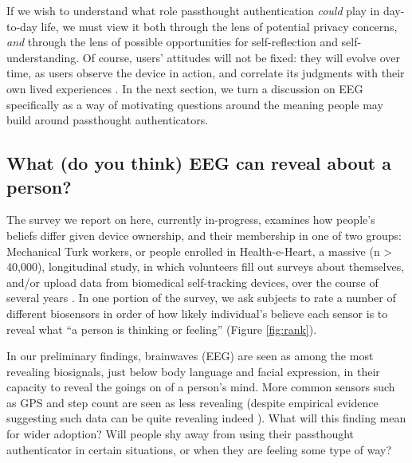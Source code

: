 \documentclass[sigconf]{acmart}
\begin{document}
If we wish to understand what role passthought authentication \emph{could} play in day-to-day life,
we must view it both through the lens of potential privacy concerns, \emph{and} through the lens of possible opportunities for self-reflection and self-understanding. 
Of course, users' attitudes will not be fixed: they will evolve over time, as users observe the device in action, and correlate its judgments with their own lived experiences \cite{Nafus2016}.
In the next section, we turn a discussion on EEG specifically as a way of motivating questions around the meaning people may build around passthought authenticators.


\subsection{What (do you think) EEG can reveal about a person?}
\label{sec:org8e44d66}

The survey we report on here, currently in-progress, examines how people's beliefs differ given device ownership, and their membership in one of two groups: Mechanical Turk workers, or people enrolled in Health-e-Heart, a massive (n > 40,000), longitudinal study, in which volunteers fill out surveys about themselves, and/or upload data from biomedical self-tracking devices, over the course of several years \cite{Estrin2010a}.
In one portion of the survey, we ask subjects to rate a number of different biosensors in order of how likely individual's believe each sensor is to reveal what ``a person is thinking or feeling'' (Figure \ref{fig:rank}).

In our preliminary findings, brainwaves (EEG) are seen as among the most revealing biosignals, just below body language and facial expression, in their capacity to reveal the goings on of a person's mind. 
More common sensors such as GPS and step count are seen as less revealing (despite empirical evidence suggesting such data can be quite revealing indeed \cite{Canzian2015}).
What will this finding mean for wider adoption? 
Will people shy away from using their passthought authenticator in certain situations, or when they are feeling some type of way?
\end{document}
